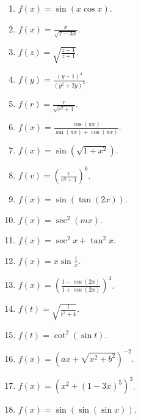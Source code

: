 \begin{problem}
\begin{multicols}{3}
\begin{enumerate}
\answer{$ $}
\item $\displaystyle f(x)=\sin (x\cos x) $.

\answer{$ $}
\item $\displaystyle f(x)=\frac{x}{\sqrt{7-3x}} $.

\answer{$ $}
\item $\displaystyle f(z)=\sqrt{\frac{z-1}{z+1}} $.

\answer{$ $}
\item $\displaystyle f(y)= \frac{(y-1)^4 }{(y^2+2y)^5}$.

\answer{$ $}
\item $\displaystyle f(r)=\frac{r}{\sqrt{r^2+1}} $.

\answer{$ $}
\item $\displaystyle f(x)=\frac{\cos (\pi x)}{\sin (\pi x)+\cos (\pi x) } $.

\answer{$ $}
\item $\displaystyle f(x)=\sin (\sqrt{1+x^2}) $.

\answer{$ $}
\item $\displaystyle f(v)=\left(\frac{v}{v^3+1}\right)^6 $.

\answer{$ $}
\item $\displaystyle f(x)=\sin (\tan (2x)) $.

\answer{$ $}
\item $\displaystyle f(x)=\sec^2(m x) $.

\answer{$ $}
\item $\displaystyle f(x)= \sec^2 x+\tan^2 x$.

\answer{$ $}
\item $\displaystyle f(x)=x\sin \frac{1}{x} $.

\answer{$ $}
\item $\displaystyle f(x)= \left(\frac{1-\cos (2x)}{1+\cos (2x)}\right)^4$.

\answer{$ $}
\item $\displaystyle f(t)=\sqrt{\frac{t}{t^2+4}} $.

\answer{$ $}
\item $\displaystyle f(t)= \cot^2(\sin t)$.

\answer{$ $}
\item $\displaystyle f(x)= (a x+\sqrt{x^2+b^2})^{-2}$.

\answer{$ $}
\item $\displaystyle f(x)= \left(x^2+(1-3x)^5\right)^3$.

\answer{$ $}
\item $\displaystyle f(x)=\sin (\sin (\sin x))$.


\end{enumerate}
\end{multicols}
\end{problem}
